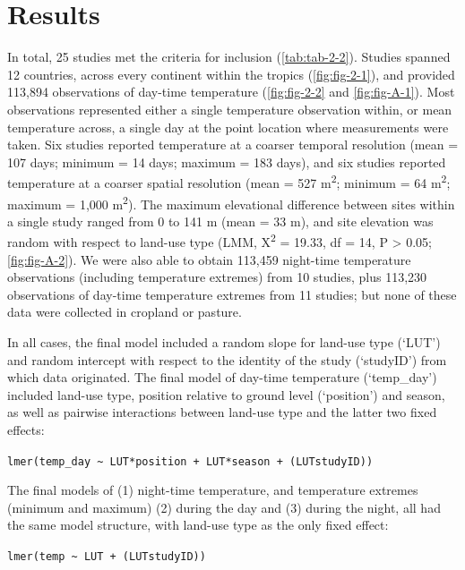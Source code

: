 \documentclass[12pt,a4paper,]{report}
\theoremstyle{definition}
\theoremstyle{definition}
\theoremstyle{definition}
\theoremstyle{remark}
\begin{document}
\section{Results}\label{results}

In total, 25 studies met the criteria for inclusion
(\autoref{tab:tab-2-2}). Studies spanned 12 countries, across every
continent within the tropics (\autoref{fig:fig-2-1}), and provided
113,894 observations of day-time temperature (\autoref{fig:fig-2-2} and
\autoref{fig:fig-A-1}). Most observations represented either a single
temperature observation within, or mean temperature across, a single day
at the point location where measurements were taken. Six studies
reported temperature at a coarser temporal resolution (mean = 107 days;
minimum = 14 days; maximum = 183 days), and six studies reported
temperature at a coarser spatial resolution (mean = 527
m\textsuperscript{2}; minimum = 64 m\textsuperscript{2}; maximum = 1,000
m\textsuperscript{2}). The maximum elevational difference between sites
within a single study ranged from 0 to 141 m (mean = 33 m), and site
elevation was random with respect to land-use type (LMM,
Χ\textsuperscript{2} = 19.33, df = 14, P \textgreater{} 0.05;
\autoref{fig:fig-A-2}). We were also able to obtain 113,459 night-time
temperature observations (including temperature extremes) from 10
studies, plus 113,230 observations of day-time temperature extremes from
11 studies; but none of these data were collected in cropland or
pasture.

In all cases, the final model included a random slope for land-use type
(`LUT') and random intercept with respect to the identity of the study
(`studyID') from which data originated. The final model of day-time
temperature (`temp\_day') included land-use type, position relative to
ground level (`position') and season, as well as pairwise interactions
between land-use type and the latter two fixed effects:

\texttt{lmer(temp\_day\ \textasciitilde{}\ LUT*position\ +\ LUT*season\ +\ (LUT\textbar{}studyID))}

The final models of (1) night-time temperature, and temperature extremes
(minimum and maximum) (2) during the day and (3) during the night, all
had the same model structure, with land-use type as the only fixed
effect:

\texttt{lmer(temp\ \textasciitilde{}\ LUT\ +\ (LUT\textbar{}studyID))}
\end{document}
